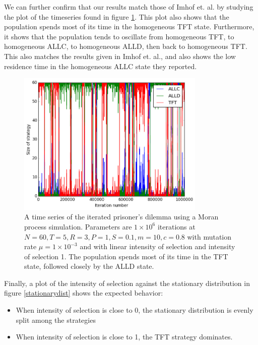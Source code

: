 We can further confirm that our results match those of Imhof et. al. by studying the plot of the timeseries found in figure \ref{timeseries}.
This plot also shows that the population spends most of its time in the homogeneous TFT state.
Furthermore, it shows that the population tends to oscillate from homogeneous TFT, to homogeneous ALLC, to homogeneous ALLD, then back to homogeneous TFT.
This also matches the results given in Imhof et. al., and also shows the low residence time in the homogeneous ALLC state they reported.

\begin{figure}[h]
    \centering
    \includegraphics[width = 0.8\textwidth]{graphics/timeseries}
    \caption{A time series of the iterated prisoner's dilemma using a Moran process simulation.
    Parameters are $1 \times 10^6$ iterations at $N = 60, T = 5, R = 3, P = 1, S = 0.1, m = 10, c = 0.8$ with mutation rate $\mu = 1 \times 10^{-3}$ and with linear intensity of selection and intensity of selection 1.
    The population spends most of its time in the TFT state, followed closely by the ALLD state.}
    \label{timeseries}
\end{figure}

Finally, a plot of the intensity of selection against the stationary distribution in figure \ref{stationarydist} shows the expected behavior:

\begin{itemize}
    \item When intensity of selection is close to 0, the stationary distribution is evenly split among the strategies
    \item When intensity of selection is close to 1, the TFT strategy dominates.
\end{itemize}

